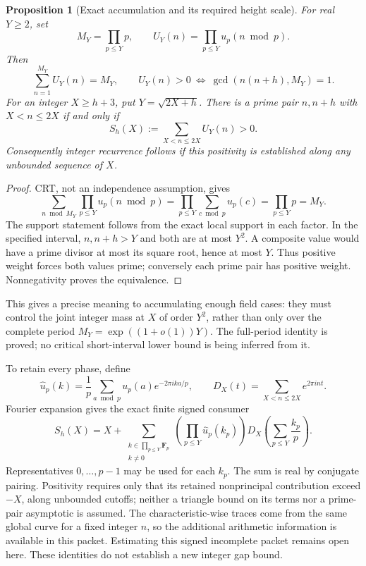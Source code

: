 \documentclass[11pt]{article}
\newtheorem{proposition}[theorem]{Proposition}
\newcommand{\F}{\mathbf F}
\begin{document}
\begin{proposition}[Exact accumulation and its required height scale]
\label{prop:integerAccumulation}
For real \(Y\geq2\), set
\[
 M_Y=\prod_{p\leq Y}p,\qquad
 U_Y(n)=\prod_{p\leq Y}u_p(n\bmod p).
\]
Then
\[
 \sum_{n=1}^{M_Y}U_Y(n)=M_Y,\qquad
 U_Y(n)>0\ \Longleftrightarrow\
                \gcd(n(n+h),M_Y)=1.
\]
For an integer \(X\geq h+3\), put \(Y=\sqrt{2X+h}\).
There is a prime pair \(n,n+h\) with \(X<n\leq2X\) if and only if
\[
                         S_h(X):=\sum_{X<n\leq2X}U_Y(n)>0.
\]
Consequently integer recurrence follows if this positivity is
established along any unbounded sequence of \(X\).
\end{proposition}
\begin{proof}
CRT, not an independence assumption, gives
\[
 \sum_{n\bmod M_Y}\prod_{p\leq Y}u_p(n\bmod p)
       =\prod_{p\leq Y}\sum_{c\bmod p}u_p(c)
       =\prod_{p\leq Y}p=M_Y.
\]
The support statement follows from the exact local support in
each factor. In the specified interval, \(n,n+h>Y\) and both
are at most \(Y^2\). A composite value would have a prime divisor
at most its square root, hence at most \(Y\).
Thus positive weight forces both values prime; conversely each
prime pair has positive weight. Nonnegativity proves the equivalence.
\end{proof}

This gives a precise meaning to accumulating enough field cases:
they must control the joint integer mass at \(X\) of order \(Y^2\),
rather than only over the complete period
\(M_Y=\exp((1+o(1))Y)\).
The full-period identity is proved; no critical short-interval
lower bound is being inferred from it.

To retain every phase, define
\[
 \widehat u_p(k)=\frac1p\sum_{a\bmod p}u_p(a)e^{-2\pi i ka/p},
 \qquad D_X(t)=\sum_{X<n\leq2X}e^{2\pi i nt}.
\]
Fourier expansion gives the exact finite signed consumer
\[
 S_h(X)=X+
 \sum_{\substack{k\in\prod_{p\leq Y}\F_p\\
                  k\ne0}}
 \left(\prod_{p\leq Y}\widehat u_p(k_p)\right)
 D_X\left(\sum_{p\leq Y}\frac{k_p}{p}\right).
\]
Representatives \(0,\ldots,p-1\) may be used for each \(k_p\).
The sum is real by conjugate pairing. Positivity requires only that
its retained nonprincipal contribution exceed \(-X\), along
unbounded cutoffs; neither a triangle bound on its terms nor a
prime-pair asymptotic is assumed. The characteristic-wise traces
come from the same global curve for a fixed integer \(n\), so the
additional arithmetic information is available in this packet.
Estimating this signed incomplete packet remains open here.
These identities do not establish a new integer gap bound.
\end{document}
